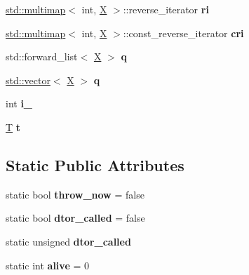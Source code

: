 \begin{DoxyCompactItemize}
\mbox{\hyperlink{classstd_1_1multimap}{std\+::multimap}}$<$ int, \mbox{\hyperlink{class_x}{X}} $>$\+::reverse\+\_\+iterator {\bfseries ri}
\item 
\mbox{\label{class_x_af0bf2bd74c482acabd84ca1768cc62f9}} 
\mbox{\hyperlink{classstd_1_1multimap}{std\+::multimap}}$<$ int, \mbox{\hyperlink{class_x}{X}} $>$\+::const\+\_\+reverse\+\_\+iterator {\bfseries cri}
\item 
\mbox{\label{class_x_a16fcd89ccaee32fc40f08d4a7668c17b}} 
std\+::forward\+\_\+list$<$ \mbox{\hyperlink{class_x}{X}} $>$ {\bfseries q}
\item 
\mbox{\label{class_x_afb827042c8515b0347bed535731c1b1d}} 
\mbox{\hyperlink{classstd_1_1vector}{std\+::vector}}$<$ \mbox{\hyperlink{class_x}{X}} $>$ {\bfseries q}
\item 
\mbox{\label{class_x_acab944a3839c924cc5f8078b89d1c6cf}} 
int {\bfseries i\+\_\+}
\item 
\mbox{\label{class_x_a070571372802c871725dbb682c1b5156}} 
\mbox{\hyperlink{struct_t}{T}} {\bfseries t}
\end{DoxyCompactItemize}
\subsection*{Static Public Attributes}
\begin{DoxyCompactItemize}
\item 
\mbox{\label{class_x_a43c52cac854c92fbc94a5db11966a91d}} 
static bool {\bfseries throw\+\_\+now} = false
\item 
\mbox{\label{class_x_a8e3186b7f3c75cf9f7436ed72f22be4d}} 
static bool {\bfseries dtor\+\_\+called} = false
\item 
\mbox{\label{class_x_a8e3186b7f3c75cf9f7436ed72f22be4d}} 
static unsigned {\bfseries dtor\+\_\+called}
\item 
\mbox{\label{class_x_a5c255dba91ffb6a65258cc746fec03f7}} 
static int {\bfseries alive} = 0
\end{DoxyCompactItemize}
